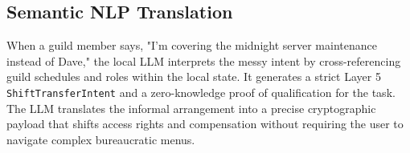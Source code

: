 \subsection{Semantic NLP Translation}
When a guild member says, "I'm covering the midnight server maintenance instead of Dave," the local LLM interprets the messy intent by cross-referencing guild schedules and roles within the local state. It generates a strict Layer 5 \texttt{ShiftTransferIntent} and a zero-knowledge proof of qualification for the task. The LLM translates the informal arrangement into a precise cryptographic payload that shifts access rights and compensation without requiring the user to navigate complex bureaucratic menus.
